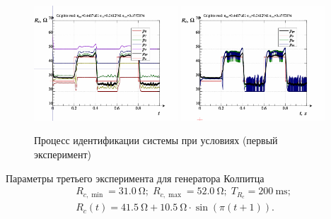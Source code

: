 \begin{figure}[htb!]
  \centerline{
    \includegraphics[width=0.48\textwidth]{p/colp_real_id_qi_fv5_0-p_p.png}
    \hfill
    \includegraphics[width=0.48\textwidth]{p/colp_real_id_qi_fv5_0-p_pp.png}
  }
  \caption{Процесс идентификации системы  при условиях (первый эксперимент)}
  \label{atu:f:colp_real_id_qi_fv5_0}
\end{figure}

Параметры третьего эксперимента для генератора Колпитца
%
\begin{equation}
  \begin{array}{c}
    R_{c,\min} = \SI{31.0}{\ohm};
    \;
    R_{c,\max} = \SI{52.0}{\ohm};
    \;
    T_{R_c} = \SI{200}{\milli\second};
  \\
    R_c(t) = \SI{41.5}{\ohm} + \SI{10.5}{\ohm} \cdot \sin( \pi ( t + 1 ) ).
  \end{array}
  \label{atu:eq:colp_test3_cond}
\end{equation}

